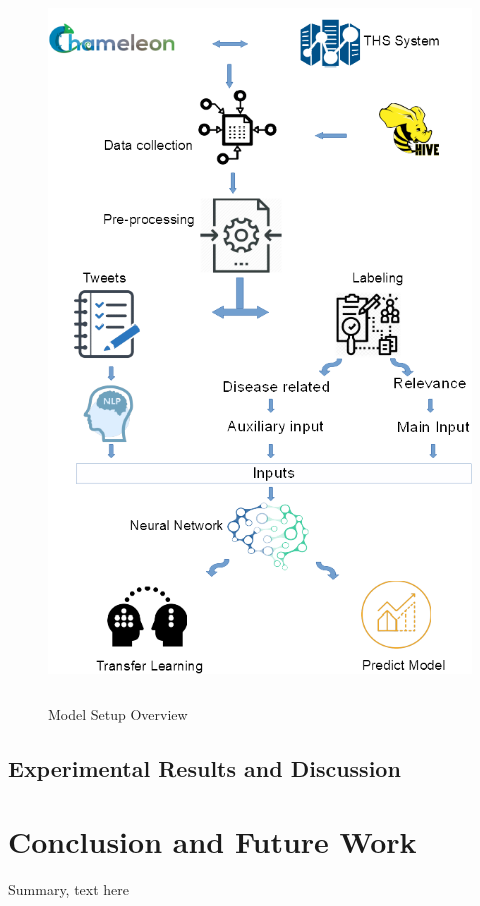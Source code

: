 \documentclass[12pt]{report}
\begin{document}
\begin{figure}[H]	
	\centering
	\includegraphics[height=190mm,  scale = 0.8]{images/10_architecture_setup.png}	
	\caption{Model Setup Overview}	
	\label{figure:model_setup}
\end{figure}

\section{Experimental Results and Discussion}


\chapter{Conclusion and Future Work} \label{chapter 6}
Summary, text here


 
\end{document}
